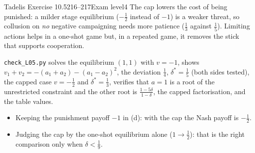\begin{exsol}{Tadelis Exercise 10.5}{216--217}{Exam level}{4}
\interp The cap lowers the cost of being punished: a milder stage equilibrium ($-\frac12$ instead of $-1$) is a
weaker threat, so collusion on \emph{no} negative campaigning needs more patience ($\frac13$ against $\frac15$). Limiting
actions helps in a one-shot game but, in a repeated game, it removes the stick that supports cooperation.

\verify \texttt{check\_L05.py} solves the equilibrium $(1,1)$ with $v=-1$, shows $v_1 + v_2 = -(a_1+a_2) - (a_1-a_2)^2$,
the deviation $\frac14$, $\delta^* = \frac15$ (both sides tested), the capped case $v = -\frac12$ and $\delta^* = \frac13$,
verifies that $a = 1$ is a root of the unrestricted constraint and the other root is $\frac{1-5\delta}{1-\delta}$, the capped
factorisation, and the table values.

\mistakes
\begin{itemize}
  \item Keeping the punishment payoff $-1$ in (d): with the cap the Nash payoff is $-\frac12$.
  \item Judging the cap by the one-shot equilibrium alone ($1 \to \frac12$): that is the right comparison only when
  $\delta < \frac19$.
\end{itemize}

\end{exsol}
